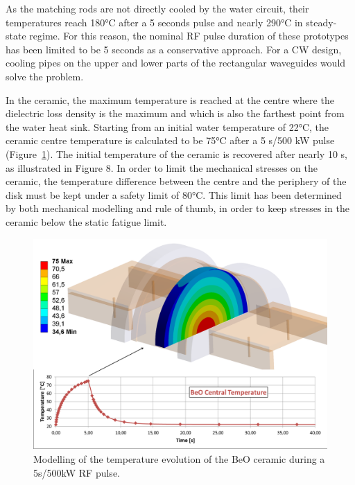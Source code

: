 As the matching rods are not directly cooled by the water circuit, their temperatures reach 180$\si{\degreeCelsius}$ after a 5 seconds pulse and nearly 290$\si{\degreeCelsius}$ in steady-state regime. For this reason, the nominal RF pulse duration of these prototypes has been limited to be 5 seconds as a conservative approach. For a CW design, cooling pipes on the upper and lower parts of the rectangular waveguides would solve the problem.

In the ceramic, the maximum temperature is reached at the centre where the dielectric loss density is the maximum and which is also the farthest point from the water heat sink. Starting from an initial water temperature of 22$\si{\degreeCelsius}$, the ceramic centre temperature is calculated to be 75$\si{\degreeCelsius}$ after a 5 s/500 kW pulse (Figure~\ref{fig:iterwindows_thermal_modeling}). The initial temperature of the ceramic is recovered after nearly 10 s, as illustrated in Figure 8. In order to limit the mechanical stresses on the ceramic, the temperature difference between the centre and the periphery of the disk must be kept under a safety limit of 80$\si{\degreeCelsius}$. This limit has been determined by both mechanical modelling and rule of thumb, in order to keep stresses in the ceramic below the static fatigue limit.

\begin{figure}
	\centering
	\includegraphics[width=1.0\linewidth]{figures/chap3/ITER_window/ITER_windows_thermal_modeling}
	\caption{Modelling of the temperature evolution of the BeO ceramic during a 5s/500kW RF pulse.}
	\label{fig:iterwindows_thermal_modeling}
\end{figure}

